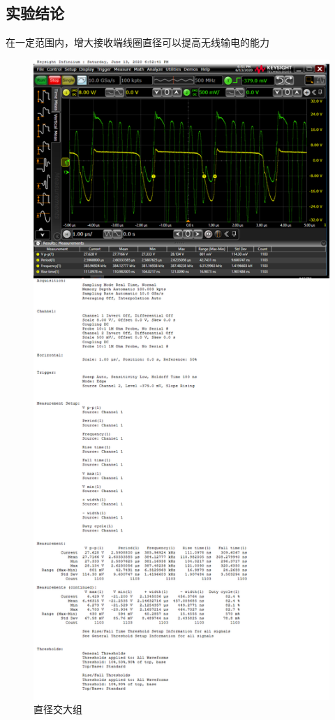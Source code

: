 \documentclass[conference]{IEEEtran}
\theoremstyle{break}
\begin{document}
\subsection{实验结论}
在一定范围内，增大接收端线圈直径可以提高无线输电的能力
\begin{figure}[htbp]
        \centerline{\includegraphics[scale=0.1]{z1.png}}
        \caption{直径交大组}
        \label{fig}
        \end{figure}       
\end{document}
